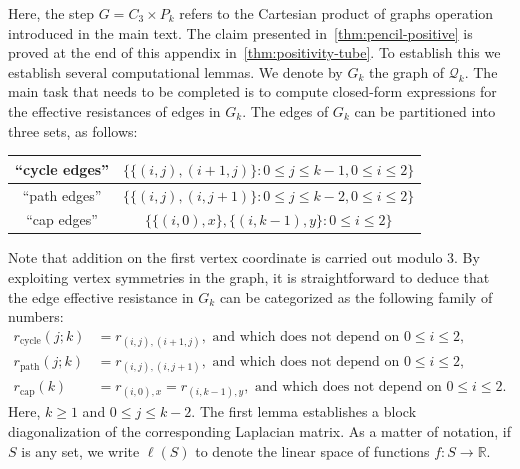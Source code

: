 \documentclass[11pt,a4paper]{amsart}
\begin{document}
Here, the step $G = C_3\times P_k$ refers to the Cartesian product of graphs operation introduced in the main text. The claim presented in~\cref{thm:pencil-positive} is proved at the end of this appendix in~\cref{thm:positivity-tube}. To establish this we establish several computational lemmas. We denote by $G_k$ the graph of $\mathcal{Q}_k$. The main task that needs to be completed is to compute closed-form expressions for the effective resistances of edges in $G_k$. The edges of $G_k$ can be partitioned into three sets, as follows:
    \medskip
    \begin{center}
        \begin{tabular}{c|c}
            ``cycle edges'' & $\big\{\{(i, j), (i+1, j)\} : 0\leq j\leq k-1, 0\leq i\leq 2\big\}$ \\\hline
            ``path edges'' & $\big\{\{(i, j), (i, j + 1)\} : 0\leq j\leq k-2, 0\leq i\leq 2\big\}$ \\\hline
            ``cap edges'' & $\big\{\{(i, 0), x\}, \{(i, k-1), y\} : 0\leq i\leq 2\big\}$
        \end{tabular}
    \end{center}
    \medskip
Note that addition on the first vertex coordinate is carried out modulo $3$. By exploiting vertex symmetries in the graph, it is straightforward to deduce that the edge effective resistance in $G_k$ can be categorized as the following family of numbers:
    \begin{align*}
        r_{\text{cycle}}( j ; k) &= r_{(i, j), ({i+1}, j)},\text{ and which does not depend on }0\leq i\leq 2,\\
        r_{\text{path}}( j ; k) &= r_{(i, j), ({i}, j + 1)},\text{ and which does not depend on }0\leq i\leq 2,\\
        r_{\text{cap}}(k) &= r_{(i, 0), x} = r_{(i, k-1), y},\text{ and which does not depend on }0\leq i\leq 2.
    \end{align*}
Here, $k\geq 1$ and $0\leq j\leq k-2$. The first lemma establishes a block diagonalization of the corresponding Laplacian matrix. As a matter of notation, if $S$ is any set, we write $\ell(S)$ to denote the linear space of functions $f:S\rightarrow\mathbb{R}$.
\end{document}
